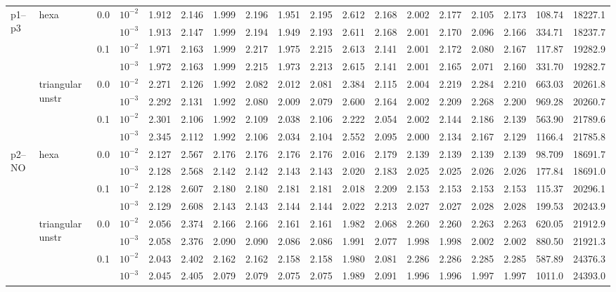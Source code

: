 \begin{longtable}{llclrrrrrrrrrrrrrr}
\multirow{8}{*}{p1--p3} & \multirow{4}{*}{hexa} & \multirow{2}{*}{0.0} & $10^{-2}$ & 1.912 & 2.146 & 1.999 & 2.196 & 1.951 & 2.195 & 2.612 & 2.168 & 2.002 & 2.177 & 2.105 & 2.173 & 108.74 & 18227.1 \\
& & & $10^{-3}$ & 1.913 & 2.147 & 1.999 & 2.194 & 1.949 & 2.193 & 2.611 & 2.168 & 2.001 & 2.170 & 2.096 & 2.166 & 334.71 & 18237.7 \\\cline{3-18}
& & \multirow{2}{*}{0.1} & $10^{-2}$ & 1.971 & 2.163 & 1.999 & 2.217 & 1.975 & 2.215 & 2.613 & 2.141 & 2.001 & 2.172 & 2.080 & 2.167 & 117.87 & 19282.9 \\
& & & $10^{-3}$ & 1.972 & 2.163 & 1.999 & 2.215 & 1.973 & 2.213 & 2.615 & 2.141 & 2.001 & 2.165 & 2.071 & 2.160 & 331.70 & 19282.7 \\\cline{2-18}
& \multirow{4}{*}{triangular unstr} & \multirow{2}{*}{0.0} & $10^{-2}$ & 2.271 & 2.126 & 1.992 & 2.082 & 2.012 & 2.081 & 2.384 & 2.115 & 2.004 & 2.219 & 2.284 & 2.210 & 663.03 & 20261.8 \\
& & & $10^{-3}$ & 2.292 & 2.131 & 1.992 & 2.080 & 2.009 & 2.079 & 2.600 & 2.164 & 2.002 & 2.209 & 2.268 & 2.200 & 969.28 & 20260.7 \\\cline{3-18}
& & \multirow{2}{*}{0.1} & $10^{-2}$ & 2.301 & 2.106 & 1.992 & 2.109 & 2.038 & 2.106 & 2.222 & 2.054 & 2.002 & 2.144 & 2.186 & 2.139 & 563.90 & 21789.6 \\
& & & $10^{-3}$ & 2.345 & 2.112 & 1.992 & 2.106 & 2.034 & 2.104 & 2.552 & 2.095 & 2.000 & 2.134 & 2.167 & 2.129 & 1166.4 & 21785.8 \\\hline

\multirow{8}{*}{p2--NO} & \multirow{4}{*}{hexa} & \multirow{2}{*}{0.0} & $10^{-2}$ & 2.127 & 2.567 & 2.176 & 2.176 & 2.176 & 2.176 & 2.016 & 2.179 & 2.139 & 2.139 & 2.139 & 2.139 & 98.709 & 18691.7 \\
& & & $10^{-3}$ & 2.128 & 2.568 & 2.142 & 2.142 & 2.143 & 2.143 & 2.020 & 2.183 & 2.025 & 2.025 & 2.026 & 2.026 & 177.84 & 18691.0 \\\cline{3-18}
& & \multirow{2}{*}{0.1} & $10^{-2}$ & 2.128 & 2.607 & 2.180 & 2.180 & 2.181 & 2.181 & 2.018 & 2.209 & 2.153 & 2.153 & 2.153 & 2.153 & 115.37 & 20296.1 \\
& & & $10^{-3}$ & 2.129 & 2.608 & 2.143 & 2.143 & 2.144 & 2.144 & 2.022 & 2.213 & 2.027 & 2.027 & 2.028 & 2.028 & 199.53 & 20243.9 \\\cline{2-18}
& \multirow{4}{*}{triangular unstr} & \multirow{2}{*}{0.0} & $10^{-2}$ & 2.056 & 2.374 & 2.166 & 2.166 & 2.161 & 2.161 & 1.982 & 2.068 & 2.260 & 2.260 & 2.263 & 2.263 & 620.05 & 21912.9 \\
& & & $10^{-3}$ & 2.058 & 2.376 & 2.090 & 2.090 & 2.086 & 2.086 & 1.991 & 2.077 & 1.998 & 1.998 & 2.002 & 2.002 & 880.50 & 21921.3 \\\cline{3-18}
& & \multirow{2}{*}{0.1} & $10^{-2}$ & 2.043 & 2.402 & 2.162 & 2.162 & 2.158 & 2.158 & 1.980 & 2.081 & 2.286 & 2.286 & 2.285 & 2.285 & 587.89 & 24376.3 \\
& & & $10^{-3}$ & 2.045 & 2.405 & 2.079 & 2.079 & 2.075 & 2.075 & 1.989 & 2.091 & 1.996 & 1.996 & 1.997 & 1.997 & 1011.0 & 24393.0 \\\hline


\end{longtable}

